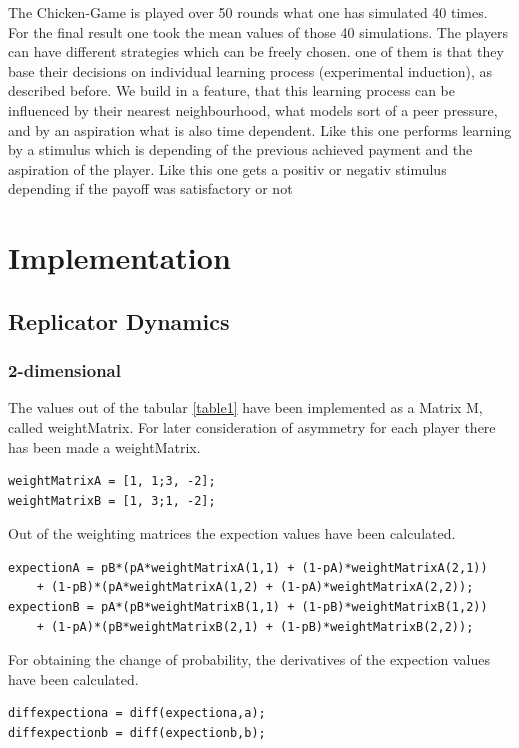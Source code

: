 \documentclass[11pt]{article}
\begin{document}
 The Chicken-Game is played over 50 rounds what one has simulated 40 times. For the final result one took the mean values of those 40 simulations. The players can have different strategies which can be freely chosen. one of them is that they base their decisions on individual learning process (experimental induction), as described before. We build in a feature, that this learning process can be influenced by their nearest neighbourhood, what models sort of a peer pressure, and by an aspiration what is also time dependent. Like this one performs learning by a stimulus which is depending of the previous achieved payment and the aspiration of the player. Like this one gets a positiv or negativ stimulus depending if the payoff was satisfactory or not


\section{Implementation}

\subsection{Replicator Dynamics}
\subsubsection{2-dimensional}

The values out of the tabular \ref{table1} have been implemented as a Matrix M, called weightMatrix. For later consideration of asymmetry for each player there has been made a weightMatrix.

\begin{verbatim}
weightMatrixA = [1, 1;3, -2]; 
weightMatrixB = [1, 3;1, -2];
\end{verbatim}

Out of the weighting matrices the expection values have been calculated.
\begin{verbatim}
expectionA = pB*(pA*weightMatrixA(1,1) + (1-pA)*weightMatrixA(2,1)) 
	+ (1-pB)*(pA*weightMatrixA(1,2) + (1-pA)*weightMatrixA(2,2));
expectionB = pA*(pB*weightMatrixB(1,1) + (1-pB)*weightMatrixB(1,2)) 
	+ (1-pA)*(pB*weightMatrixB(2,1) + (1-pB)*weightMatrixB(2,2));
\end{verbatim}

For obtaining the change of probability, the derivatives of the expection values have been calculated.
\begin{verbatim}
diffexpectiona = diff(expectiona,a);
diffexpectionb = diff(expectionb,b);
\end{verbatim}
\end{document}
